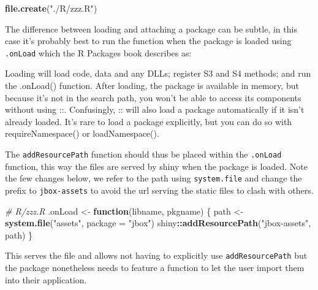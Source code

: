 \documentclass[
]{krantz}
\makeatletter
\newenvironment{Shaded}{\begin{snugshade}}{\end{snugshade}}
\newcommand{\CommentTok}[1]{\textcolor[rgb]{0.37,0.37,0.37}{\textit{#1}}}
\newcommand{\ControlFlowTok}[1]{\textcolor[rgb]{0.27,0.27,0.27}{\textbf{#1}}}
\newcommand{\DataTypeTok}[1]{\textcolor[rgb]{0.27,0.27,0.27}{#1}}
\newcommand{\KeywordTok}[1]{\textcolor[rgb]{0.27,0.27,0.27}{\textbf{#1}}}
\newcommand{\NormalTok}[1]{#1}
\newcommand{\OperatorTok}[1]{\textcolor[rgb]{0.43,0.43,0.43}{\textbf{#1}}}
\newcommand{\StringTok}[1]{\textcolor[rgb]{0.5,0.5,0.5}{#1}}
\renewenvironment{quote}{\begin{VF}}{\end{VF}}
\newenvironment{kframe}{%
\medskip{}
\setlength{\fboxsep}{.8em}
 \def\at@end@of@kframe{}%
 \ifinner\ifhmode%
  \def\at@end@of@kframe{\end{minipage}}%
  \begin{minipage}{\columnwidth}%
 \fi\fi%
 \def\FrameCommand##1{\hskip\@totalleftmargin \hskip-\fboxsep
 \colorbox{shadecolor}{##1}\hskip-\fboxsep
     \hskip-\linewidth \hskip-\@totalleftmargin \hskip\columnwidth}%
 \MakeFramed {\advance\hsize-\width
   \@totalleftmargin\z@ \linewidth\hsize
   \@setminipage}}%
 {\par\unskip\endMakeFramed%
 \at@end@of@kframe}
\renewenvironment{Shaded}{\begin{kframe}}{\end{kframe}}
\makeatother
\begin{document}
\begin{Shaded}
\begin{Highlighting}[]
\KeywordTok{file.create}\NormalTok{(}\StringTok{"./R/zzz.R"}\NormalTok{)}
\end{Highlighting}
\end{Shaded}

The difference between loading and attaching a package can be subtle, in this case it's probably best to run the function when the package is loaded using \texttt{.onLoad} which the R Packages book describes as:

\begin{quote}
Loading will load code, data and any DLLs; register S3 and S4 methods; and run the .onLoad() function. After loading, the package is available in memory, but because it's not in the search path, you won't be able to access its components without using ::. Confusingly, :: will also load a package automatically if it isn't already loaded. It's rare to load a package explicitly, but you can do so with requireNamespace() or loadNamespace().
\end{quote}

The \texttt{addResourcePath} function should thus be placed within the \texttt{.onLoad} function, this way the files are served by shiny when the package is loaded. Note the few changes below, we refer to the path using \texttt{system.file} and change the prefix to \texttt{jbox-assets} to avoid the url serving the static files to clash with others.

\begin{Shaded}
\begin{Highlighting}[]
\CommentTok{\# R/zzz.R}
\NormalTok{.onLoad <{-}}\StringTok{ }\ControlFlowTok{function}\NormalTok{(libname, pkgname) \{}
\NormalTok{  path <{-}}\StringTok{ }\KeywordTok{system.file}\NormalTok{(}\StringTok{"assets"}\NormalTok{, }\DataTypeTok{package =} \StringTok{"jbox"}\NormalTok{)}
\NormalTok{  shiny}\OperatorTok{::}\KeywordTok{addResourcePath}\NormalTok{(}\StringTok{"jbox{-}assets"}\NormalTok{, path)}
\NormalTok{\}}
\end{Highlighting}
\end{Shaded}

This serves the file and allows not having to explicitly use \texttt{addResourcePath} but the package nonetheless needs to feature a function to let the user import them into their application.
\end{document}
